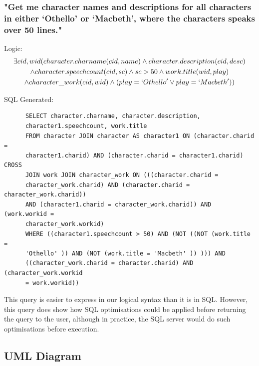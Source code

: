 \documentclass[a4paper, 11pt]{article}
\begin{document}
      \subsubsection*{"Get me character names and descriptions for all
        characters in either `Othello' or `Macbeth', where the characters
      speaks over 50 lines."}

      Logic:
      \begin{multline}
        \exists cid,wid(character.charname(cid, name) \land character.description(cid,
        desc) \\
        \land character.speechcount(cid, sc) \land sc > 50 
        \land work.title(wid, play) 
        \\ \land character\_work(cid, wid) \land (play = `Othello' 
        \lor play = `Macbeth'))
      \end{multline}

      SQL Generated:
      \begin{verbatim}
      SELECT character.charname, character.description,
      character1.speechcount, work.title
      FROM character JOIN character AS character1 ON (character.charid =
      character1.charid) AND (character.charid = character1.charid) CROSS
      JOIN work JOIN character_work ON (((character.charid =
      character_work.charid) AND (character.charid = character_work.charid))
      AND (character1.charid = character_work.charid)) AND (work.workid =
      character_work.workid)
      WHERE ((character1.speechcount > 50) AND (NOT ((NOT (work.title =
      'Othello' )) AND (NOT (work.title = 'Macbeth' )) ))) AND
      ((character_work.charid = character.charid) AND (character_work.workid
      = work.workid))
      \end{verbatim}

      This query is easier to express in our logical syntax than it is in SQL.
      However, this query does show how SQL optimisations could be applied
      before returning the query to the user, although in practice, the SQL
      server would do such optimisations before execution.

  \subsection{UML Diagram}
\end{document}
